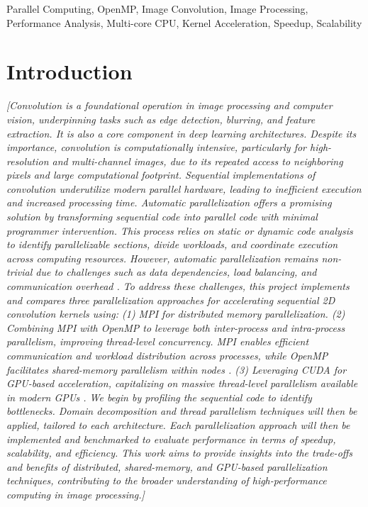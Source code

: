 \documentclass[conference, 10pt]{IEEEtran}
\begin{document}
\begin{IEEEkeywords}
Parallel Computing, OpenMP, Image Convolution, Image Processing, Performance Analysis, Multi-core CPU, Kernel Acceleration, Speedup, Scalability
\end{IEEEkeywords}


\section{Introduction}
\textit{{\color{blue} %
[Convolution is a foundational operation in image processing and computer vision, 
underpinning tasks such as edge detection, blurring, and feature extraction. It is also a core component in deep learning architectures. 
Despite its importance, convolution is computationally intensive, particularly for high-resolution and multi-channel images, 
due to its repeated access to neighboring pixels and large computational footprint.
Sequential implementations of convolution underutilize modern parallel hardware, leading to inefficient execution and increased processing time. 
Automatic parallelization offers a promising solution by transforming sequential code into parallel code with minimal programmer intervention. 
This process relies on static or dynamic code analysis to identify parallelizable sections,
divide workloads, and coordinate execution across computing resources. 
However, automatic parallelization remains non-trivial due to challenges such as data dependencies, 
load balancing, and communication overhead \cite{hager2021hpc}.
To address these challenges, this project implements and compares three parallelization approaches 
for accelerating sequential 2D convolution kernels using: 
(1) MPI for distributed memory parallelization\cite{toth2016convolution}. 
(2) Combining MPI with OpenMP to leverage both inter-process and intra-process parallelism, improving thread-level concurrency.
MPI enables efficient communication and workload distribution across processes, 
while OpenMP facilitates shared-memory parallelism within nodes \cite{farber2011openmp}. 
(3) Leveraging CUDA for GPU-based acceleration,
capitalizing on massive thread-level parallelism available in modern GPUs \cite{nvidia2021cuda}.
We begin by profiling the sequential code to identify bottlenecks. 
Domain decomposition and thread parallelism techniques will then be applied, tailored to each architecture. 
Each parallelization approach will then be implemented and benchmarked 
to evaluate performance in terms of speedup, scalability, and efficiency.
This work aims to provide insights into the trade-offs and benefits of distributed, shared-memory, and GPU-based parallelization techniques, 
contributing to the broader understanding of high-performance computing in image processing.]
}}
\end{document}
